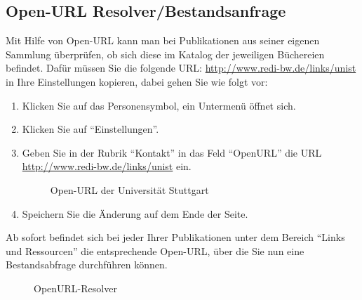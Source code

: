 \begin{description}
\subsection{Open-URL Resolver/Bestandsanfrage}
Mit Hilfe von Open-URL kann man bei Publikationen aus seiner eigenen Sammlung überprüfen, ob sich diese im Katalog der jeweiligen Büchereien befindet. Dafür müssen Sie  die folgende URL:  
\url{http://www.redi-bw.de/links/unist} in Ihre Einstellungen kopieren, dabei gehen Sie wie folgt vor:
\begin{enumerate}
    \item Klicken Sie auf das Personensymbol, ein Untermenü öffnet sich.
    \item Klicken Sie auf \enquote{Einstellungen}.
    \item Geben Sie in der Rubrik \enquote{Kontakt} in das Feld \enquote{OpenURL} die URL \url{http://www.redi-bw.de/links/unist} ein. 
\begin{figure}[h!]
 \centering
 \caption{Open-URL der Universität Stuttgart}
 \label{figure031}
\end{figure}
    \item Speichern Sie die Änderung auf dem Ende der Seite.
\end{enumerate}
Ab sofort befindet sich bei jeder Ihrer Publikationen unter dem Bereich \enquote{Links und Ressourcen} die entsprechende Open-URL, über die Sie nun eine Bestandsabfrage durchführen können.
\begin{figure}[h!]
 \centering
 \caption{OpenURL-Resolver}
 \label{figure032}
\end{figure}

\end{description}
